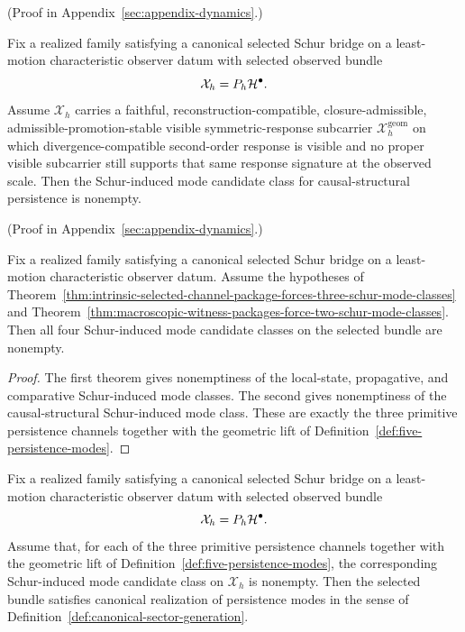 (Proof in Appendix~\ref{sec:appendix-dynamics}.)

\begin{theorem}
\label{thm:macroscopic-witness-packages-force-two-schur-mode-classes}
Fix a realized family satisfying a canonical selected Schur bridge on a
least-motion characteristic observer datum with selected observed bundle
\[
\mathcal X_h=P_h\mathcal{H}^\bullet.
\]
Assume \(\mathcal X_h\) carries a faithful, reconstruction-compatible,
closure-admissible, admissible-promotion-stable visible symmetric-response
subcarrier \(\mathcal X_h^{\mathrm{geom}}\) on which divergence-compatible
second-order response is visible and no proper visible subcarrier still
supports that same response signature at the observed scale. Then the
Schur-induced mode candidate class for causal-structural persistence is
nonempty.
\end{theorem}

(Proof in Appendix~\ref{sec:appendix-dynamics}.)

\begin{corollary}
\label{cor:intrinsic-package-plus-macroscopic-witnesses-force-five-schur-nonempty}
Fix a realized family satisfying a canonical selected Schur bridge on a
least-motion characteristic observer datum. Assume the hypotheses of
Theorem~\ref{thm:intrinsic-selected-channel-package-forces-three-schur-mode-classes}
and
Theorem~\ref{thm:macroscopic-witness-packages-force-two-schur-mode-classes}.
Then all four Schur-induced mode candidate classes on the selected bundle are
nonempty.
\end{corollary}

\begin{proof}
The first theorem gives nonemptiness of the local-state, propagative, and
comparative Schur-induced mode classes. The second gives nonemptiness of the
causal-structural Schur-induced mode class. These are exactly the three
primitive persistence channels together with the geometric lift of
Definition~\ref{def:five-persistence-modes}.
\end{proof}

\begin{theorem}
\label{thm:four-nonempty-schur-induced-mode-classes-force-canonical-realization}
Fix a realized family satisfying a canonical selected Schur bridge on a
least-motion characteristic observer datum with selected observed bundle
\[
\mathcal X_h=P_h\mathcal{H}^\bullet.
\]
Assume that, for each of the three primitive persistence channels together
with the geometric lift of Definition~\ref{def:five-persistence-modes}, the
corresponding Schur-induced mode candidate class on \(\mathcal X_h\) is
nonempty. Then the selected bundle satisfies canonical realization of
persistence modes in the sense of
Definition~\ref{def:canonical-sector-generation}.
\end{theorem}

